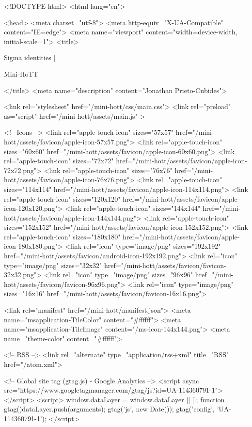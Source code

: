 <!DOCTYPE html>
<html lang="en">

<head>
  <meta charset="utf-8">
  <meta http-equiv="X-UA-Compatible" content="IE=edge">
  <meta name="viewport" content="width=device-width, initial-scale=1">
  <title>
    
      
        Sigma identities |
      
        Mini-HoTT
    
  </title>
  <meta name="description" content="Jonathan Prieto-Cubides">

  <link rel="stylesheet" href="/mini-hott/css/main.css">
  <link rel="preload" as="script" href="/mini-hott/assets/main.js" >

  <!-- Icons -->
  <link rel="apple-touch-icon" sizes="57x57" href="/mini-hott/assets/favicon/apple-icon-57x57.png">
  <link rel="apple-touch-icon" sizes="60x60" href="/mini-hott/assets/favicon/apple-icon-60x60.png">
  <link rel="apple-touch-icon" sizes="72x72" href="/mini-hott/assets/favicon/apple-icon-72x72.png">
  <link rel="apple-touch-icon" sizes="76x76" href="/mini-hott/assets/favicon/apple-icon-76x76.png">
  <link rel="apple-touch-icon" sizes="114x114" href="/mini-hott/assets/favicon/apple-icon-114x114.png">
  <link rel="apple-touch-icon" sizes="120x120" href="/mini-hott/assets/favicon/apple-icon-120x120.png">
  <link rel="apple-touch-icon" sizes="144x144" href="/mini-hott/assets/favicon/apple-icon-144x144.png">
  <link rel="apple-touch-icon" sizes="152x152" href="/mini-hott/assets/favicon/apple-icon-152x152.png">
  <link rel="apple-touch-icon" sizes="180x180" href="/mini-hott/assets/favicon/apple-icon-180x180.png">
  <link rel="icon" type="image/png" sizes="192x192"  href="/mini-hott/assets/favicon/android-icon-192x192.png">
  <link rel="icon" type="image/png" sizes="32x32" href="/mini-hott/assets/favicon/favicon-32x32.png">
  <link rel="icon" type="image/png" sizes="96x96" href="/mini-hott/assets/favicon/favicon-96x96.png">
  <link rel="icon" type="image/png" sizes="16x16" href="/mini-hott/assets/favicon/favicon-16x16.png">

  <link rel="manifest" href="/mini-hott/manifest.json">
  <meta name="msapplication-TileColor" content="#ffffff">
  <meta name="msapplication-TileImage" content="/ms-icon-144x144.png">
  <meta name="theme-color" content="#ffffff">

  <!-- RSS -->
  <link rel="alternate" type="application/rss+xml" title="RSS" href="/atom.xml">

  <!-- Global site tag (gtag.js) - Google Analytics -->
  <script async src="https://www.googletagmanager.com/gtag/js?id=UA-114360791-1"></script>
  <script>
    window.dataLayer = window.dataLayer || [];
    function gtag(){dataLayer.push(arguments);}
    gtag('js', new Date());
    gtag('config', 'UA-114360791-1');
  </script>

